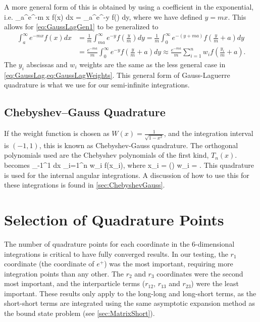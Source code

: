 \documentclass[Dissertation.tex]{subfiles}
\begin{document}
\noindent A more general form of this is obtained by using a coefficient in the exponential, i.e.
\beq
\label{eq:GaussLagGen2}
\int_a^\infty e^{-m x} f(x) dx =  \int_a^\infty e^{-y} f\left(\right) dy,
\eeq
where we have defined $y = m x$.  This allows for \cref{eq:GaussLagGen1} to be generalized to
\begin{align}
\label{eq:GaussLagGen}
\nonumber \int_a^\infty e^{-m x} f(x) dx &= \frac{1}{m} \int_{ma}^\infty e^{-y} f\left(\frac{y}{m}\right) dy = \frac{1}{m} \int_0^\infty e^{-(y+ma)} f\left(\frac{y}{m}+a\right) dy \\
& = \frac{e^{-ma}}{m} \int_0^\infty e^{-y} f\left(\frac{y}{m}+a\right) dy \approx \frac{e^{-ma}}{m} \sum_{i=1}^n w_i f\left(\frac{y_i}{m}+a\right).
\end{align}
The $y_i$ abscissas and $w_i$ weights are the same as the less general case in
\cref{eq:GaussLag,eq:GaussLagWeights}. This general form of Gauss-Laguerre
quadrature is what we use for our semi-infinite integrations.


\subsection{Chebyshev--Gauss Quadrature}
\label{sec:ChebyshevGauss1}
If the weight function is chosen as $W(x)=\frac{1}{\sqrt{1-x^2}}$, and the
integration interval is $(-1,1)$, this is known as Chebyshev-Gauss quadrature.
The orthogonal polynomials used are the Chebyshev polynomials of the first
kind, $T_n(x)$.  becomes
\beq
\label{eq:GaussCheb}
\int_{-1}^1  dx \approx \sum_{i=1}^n w_i f(x_i),
\eeq
where
\beq
\label{eq:GaussChebAbsWeights}
x_i = \cos\left(\pi\right)  w_i = .
\eeq
This quadrature is used for the internal angular integrations. A discussion of
how to use this for these integrations is found in \cref{sec:ChebyshevGauss}.



\section{Selection of Quadrature Points}
\label{sec:SelQuadPoints}


The number of quadrature points for each coordinate in the 6-dimensional 
integrations is critical to have fully converged results. In our testing, the 
$r_1$ coordinate (the coordinate of $e^+$) was the most important, requiring 
more integration points than any other. The $r_2$ and $r_3$ coordinates were 
the second most important, and the interparticle terms ($r_{12}$, $r_{13}$ 
and $r_{23}$) were the least important. These results only apply to the
long-long and long-short terms, as the short-short terms are integrated using 
the same asymptotic expansion method as the bound state problem
(see \cref{sec:MatrixShort}).
\end{document}
